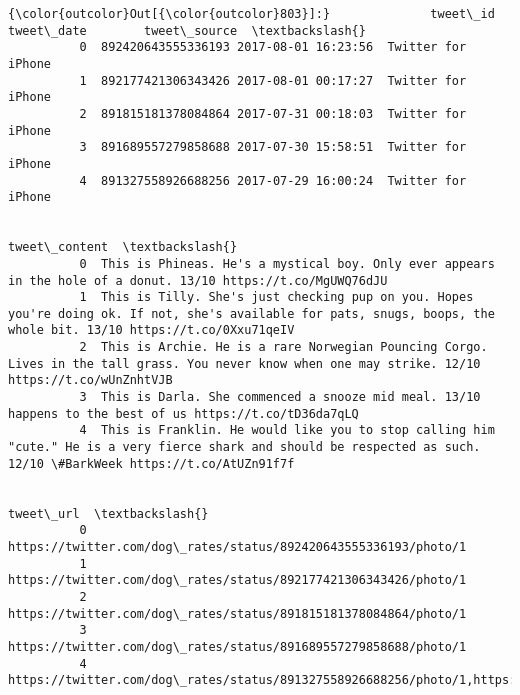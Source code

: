 \documentclass[11pt]{article}
\begin{document}
\begin{Verbatim}[commandchars=\\\{\}]
{\color{outcolor}Out[{\color{outcolor}803}]:}              tweet\_id          tweet\_date        tweet\_source  \textbackslash{}
          0  892420643555336193 2017-08-01 16:23:56  Twitter for iPhone   
          1  892177421306343426 2017-08-01 00:17:27  Twitter for iPhone   
          2  891815181378084864 2017-07-31 00:18:03  Twitter for iPhone   
          3  891689557279858688 2017-07-30 15:58:51  Twitter for iPhone   
          4  891327558926688256 2017-07-29 16:00:24  Twitter for iPhone   
          
                                                                                                                                                                  tweet\_content  \textbackslash{}
          0  This is Phineas. He's a mystical boy. Only ever appears in the hole of a donut. 13/10 https://t.co/MgUWQ76dJU                                                        
          1  This is Tilly. She's just checking pup on you. Hopes you're doing ok. If not, she's available for pats, snugs, boops, the whole bit. 13/10 https://t.co/0Xxu71qeIV   
          2  This is Archie. He is a rare Norwegian Pouncing Corgo. Lives in the tall grass. You never know when one may strike. 12/10 https://t.co/wUnZnhtVJB                    
          3  This is Darla. She commenced a snooze mid meal. 13/10 happens to the best of us https://t.co/tD36da7qLQ                                                              
          4  This is Franklin. He would like you to stop calling him "cute." He is a very fierce shark and should be respected as such. 12/10 \#BarkWeek https://t.co/AtUZn91f7f   
          
                                                                                                                                   tweet\_url  \textbackslash{}
          0  https://twitter.com/dog\_rates/status/892420643555336193/photo/1                                                                   
          1  https://twitter.com/dog\_rates/status/892177421306343426/photo/1                                                                   
          2  https://twitter.com/dog\_rates/status/891815181378084864/photo/1                                                                   
          3  https://twitter.com/dog\_rates/status/891689557279858688/photo/1                                                                   
          4  https://twitter.com/dog\_rates/status/891327558926688256/photo/1,https://twitter.com/dog\_rates/status/891327558926688256/photo/1   
          

\end{Verbatim}
\end{document}
